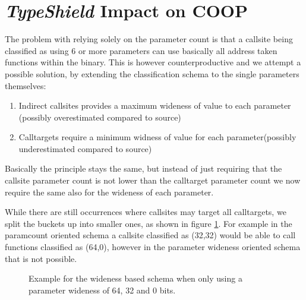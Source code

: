 \section{\textit{TypeShield} Impact on COOP}
\label{TypeShild Impact on COOP}
The problem with relying solely on the parameter count is that a callsite being classified as using 6 or more parameters can use basically all address taken functions within the binary. This is however counterproductive and we attempt a possible solution, by extending the classification schema to the single parameters themselves:

\begin{enumerate}
\item Indirect callsites provides a maximum wideness of value to each parameter (possibly overestimated compared to source)
\item Calltargets require a minimum widness of value for each parameter(possibly underestimated compared to source)
\end{enumerate}

Basically the principle stays the same, but instead of just requiring that the callsite parameter count is not lower than the calltarget parameter count we now require the same also for the wideness of each parameter.

While there are still occurrences where callsites may target all calltargets, we split the buckets up into smaller ones, as shown in figure \ref{fig:lattice3264}. For example in the paramcount oriented schema a callsite classified as (32,32) would be able to call functions classified as (64,0), however in the parameter wideness oriented schema that is not possible.

\begin{figure}[!h]
\centering
{}
\caption{Example for the wideness based schema when only using a parameter wideness of 64, 32 and 0 bits.}
\label{fig:lattice3264}
\end{figure}